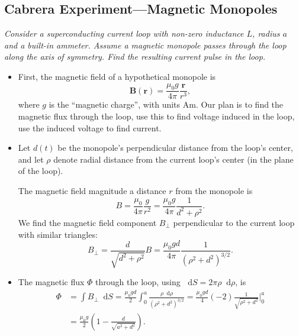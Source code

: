\documentclass[11pt, a4paper]{article}
\newcommand{\diff}{\mathop{}\!\mathrm{d}} %
\renewcommand{\vec}[1]{\bm{#1}} %
\renewcommand{\r}{\vec{r}}
\newcommand{\B}{\vec{B}}  %
\newcommand{\mm}{\mu_{0}}  %
\newcommand{\m}{\vec{m}}  %
\begin{document}
\subsection{Cabrera Experiment---Magnetic Monopoles}
\textit{Consider a superconducting current loop with non-zero inductance $ L$, radius $ a $ and a built-in ammeter. Assume a magnetic monopole passes through the loop along the axis of symmetry. Find the resulting current pulse in the loop.}
\begin{itemize}
	\item First, the magnetic field of a hypothetical monopole is
	\begin{equation*}
		\B(\r) = \frac{\mm g}{4\pi} \frac{\r}{r^{3}},
	\end{equation*}
	where $ g $ is the ``magnetic charge'', with units $ \si{\ampere \meter} $. Our plan is to find the magnetic flux through the loop, use this to find voltage induced in the loop, use the induced voltage to find current.
	
	\item Let $ d(t) $ be the monopole's perpendicular distance from the loop's center, and let $ \rho $ denote radial distance from the current loop's center (in the plane of the loop).
	
	The magnetic field magnitude a distance $ r $ from the monopole is
	\begin{equation*}
		B = \frac{\mm}{4\pi} \frac{g}{r^{2}} = \frac{\mm g}{4\pi}\frac{1}{d^{2} + \rho^{2}}.
	\end{equation*}
	We find the magnetic field component $ B_{\perp} $ perpendicular to the current loop with similar triangles:
	\begin{equation*}
		B_{\perp} = \frac{d}{\sqrt{d^{2} + \rho^{2}}} B = \frac{\mm g d}{4\pi}\frac{1}{(\rho^{2} + d^{2})^{3/2}}.
	\end{equation*}
	
	\item The magnetic flux $ \Phi $ through the loop, using $  \diff S = 2\pi \rho \diff \rho $, is
	\begin{align*}
		\Phi &= \int B_{\perp} \diff S = \frac{\mm g d}{2} \int_{0}^{a} \frac{\rho \diff \rho}{(\rho^{2} + d^{2})^{3/2}} = \frac{\mm g d}{4}(-2)\frac{1}{\sqrt{\rho^{2} + d^{2}}}\bigg |_{0}^{a}\\
		& = \frac{\mm g}{2}\left(1 - \frac{d}{\sqrt{a^{2} + d^{2}}}\right).
	\end{align*}
	

\end{itemize}
\end{document}

